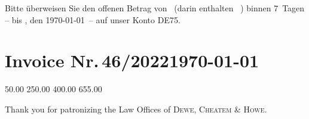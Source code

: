 \documentclass[12pt]{scrartcl}		%
\begin{document}
\def\payperiod{7}					%

Bitte überweisen Sie den offenen Betrag von 
\Total\ (darin enthalten \TaxAmnt ~\TaxAbrv) 
binnen \payperiod~Tagen – bis \DayName{\year}{\month}{\day+\payperiod}, 
den \AdvanceDate[\payperiod]\today\ – 
auf unser Konto DE75.

\AdvanceDate[-\payperiod]		%


\section*{Invoice Nr.\,46/2022\hfill\today}

\makeatletter
	\renewcommand*\@running		{Nr.}				%
	\renewcommand*\@amount		{Amount}			%
	\renewcommand*\@itemnr		{~}					%
	\renewcommand*\@description	{Description}		%
	\renewcommand*\@unitprice	{Base Fee}			%
	\renewcommand*\@totalprice	{Total}				%
	\renewcommand*\@decimalsep	{.}					%
\makeatother

\UseDollar
	\begin{invoice*}[B]				%
		\NumbersOff					%
		\SeparatorOff				%
					{50.00}
				{250.00}
			{400.00}
			{655.00}
	\end{invoice*}

\def\payperiod{14}					%
\enlargethispage{2\baselineskip}

Thank you for patronizing the Law Offices of \textsc{Dewe, Cheatem \& Howe}.
\end{document}
